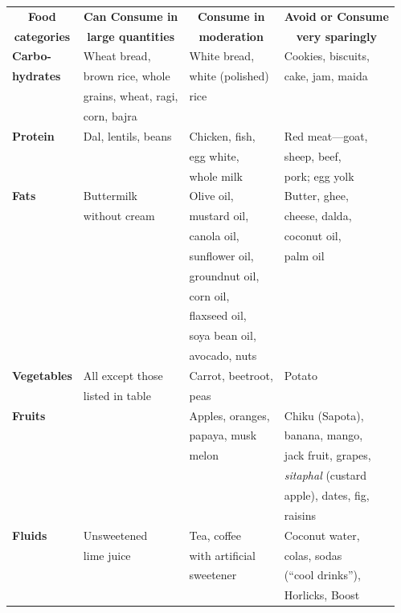 {
\small\addtolength{\tabcolsep}{-5pt}
\begin{longtable}{|l|l|l|l|}
\hline
\multicolumn{1}{|c}{\textbf{Food}} & \multicolumn{1}{|c}{\textbf{Can Consume in}} & \multicolumn{1}{|c}{\textbf{Consume in}} & \multicolumn{1}{|c|}{\textbf{Avoid or Consume}}\\
\multicolumn{1}{|c}{\textbf{categories}} & \multicolumn{1}{|c}{\textbf{large quantities}} & \multicolumn{1}{|c}{\textbf{moderation}} & \multicolumn{1}{|c|}{\textbf{very sparingly}}\\
\hline
\textbf{Carbo-} & Wheat bread, & White bread, & Cookies, biscuits,\\
\textbf{hydrates} & brown rice, whole & white (polished) & cake, jam, maida\\
 & grains, wheat, ragi, & rice & \\
 & corn, bajra &  & \\
\hline
\textbf{Protein} & Dal, lentils, beans & Chicken, fish, & Red meat—goat,\\
 &  & egg white, & sheep, beef,\\
 &  & whole milk & pork; egg yolk\\
\hline
\textbf{Fats} & Buttermilk & Olive oil, & Butter, ghee,\\
 & without cream & mustard oil, & cheese, dalda,\\
 &  & canola oil, & coconut oil,\\
 &  & sunflower oil, & palm oil\\
 &  & groundnut oil, & \\
 &  & corn oil, & \\
 &  & flaxseed oil, & \\
 &  & soya bean oil, & \\
 &  & avocado, nuts & \\
\hline
\textbf{Vegetables} & All except those & Carrot, beetroot, & Potato\\
 & listed in table & peas & \\
\hline
\textbf{Fruits} &  & Apples, oranges, & Chiku (Sapota),\\
 &  & papaya, musk & banana, mango,\\
 &  & melon & jack fruit, grapes,\\
 &  &  & \textit{sitaphal} (custard\\
 &  &  & apple), dates, fig,\\
 &  &  & raisins\\
\hline
\textbf{Fluids} & Unsweetened & Tea, coffee & Coconut water,\\
 & lime juice & with artificial & colas, sodas\\
 &  & sweetener & (“cool drinks”),\\
 &  &  & Horlicks, Boost\\
\hline
\end{longtable}
}\relax

